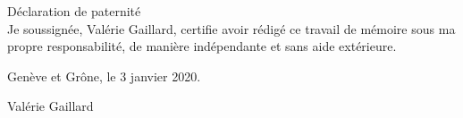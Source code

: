 
\begin{titlepage}
 \begin{center}
    \Large
    Déclaration de paternité\\





 Je soussignée, Valérie Gaillard, certifie avoir rédigé ce travail de mémoire sous ma propre responsabilité, de manière indépendante et sans aide extérieure.




 \vfill

 Genève et Grône, le 3 janvier 2020.


 Valérie Gaillard




	 \hfill \\
	 \rule{0mm}{0.5pt} \hfill
 \end{center}
\end{titlepage}
